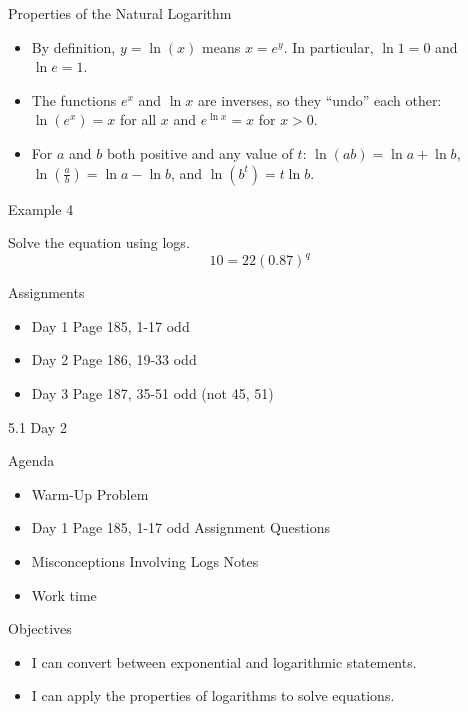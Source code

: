 \documentclass[ignorenonframetext,]{beamer}
\providecommand{\tightlist}{%
  \setlength{\itemsep}{0pt}\setlength{\parskip}{0pt}}
\begin{document}
\begin{frame}{Properties of the Natural Logarithm}

\begin{itemize}
\tightlist
\item
  By definition, \(y = \ln(x)\) means \(x = e^y\). In particular,
  \(\ln 1 = 0\) and \(\ln e = 1\).
\item
  The functions \(e^x\) and \(\ln x\) are inverses, so they ``undo''
  each other: \(\ln(e^x) = x\) for all \(x\) and \(e^{\ln x} = x\) for
  \(x > 0\).
\item
  For \(a\) and \(b\) both positive and any value of \(t\):
  \(\ln (ab) = \ln a + \ln b\),
  \(\ln \left(\frac{a}{b}\right) = \ln a - \ln b\), and
  \(\ln (b^t) = t\ln b\).
\end{itemize}

\end{frame}

\begin{frame}{Example 4}

Solve the equation using logs. \[10 = 22(0.87)^q\]

\end{frame}

\begin{frame}{Assignments}

\begin{itemize}
\tightlist
\item
  Day 1 Page 185, 1-17 odd
\item
  Day 2 Page 186, 19-33 odd
\item
  Day 3 Page 187, 35-51 odd (not 45, 51)
\end{itemize}

\end{frame}

\begin{frame}{5.1 Day 2}

\begin{block}{Agenda}

\begin{itemize}
\tightlist
\item
  Warm-Up Problem
\item
  Day 1 Page 185, 1-17 odd Assignment Questions
\item
  Misconceptions Involving Logs Notes
\item
  Work time
\end{itemize}

\end{block}

\begin{block}{Objectives}

\begin{itemize}
\tightlist
\item
  I can convert between exponential and logarithmic statements.
\item
  I can apply the properties of logarithms to solve equations.
\end{itemize}

\end{block}

\end{frame}
\end{document}
